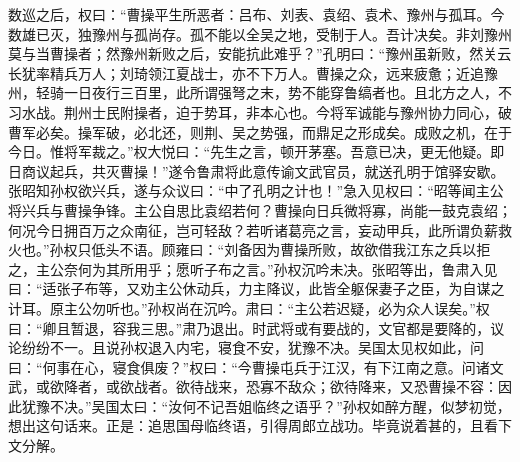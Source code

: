 数巡之后，权曰：“曹操平生所恶者：吕布、刘表、袁绍、袁术、豫州与孤耳。今数雄已灭，独豫州与孤尚存。孤不能以全吴之地，受制于人。吾计决矣。非刘豫州莫与当曹操者；然豫州新败之后，安能抗此难乎？”孔明曰：“豫州虽新败，然关云长犹率精兵万人；刘琦领江夏战士，亦不下万人。曹操之众，远来疲惫；近追豫州，轻骑一日夜行三百里，此所谓强弩之末，势不能穿鲁缟者也。且北方之人，不习水战。荆州士民附操者，迫于势耳，非本心也。今将军诚能与豫州协力同心，破曹军必矣。操军破，必北还，则荆、吴之势强，而鼎足之形成矣。成败之机，在于今日。惟将军裁之。”权大悦曰：“先生之言，顿开茅塞。吾意已决，更无他疑。即日商议起兵，共灭曹操！”遂令鲁肃将此意传谕文武官员，就送孔明于馆驿安歇。张昭知孙权欲兴兵，遂与众议曰：“中了孔明之计也！”急入见权曰：“昭等闻主公将兴兵与曹操争锋。主公自思比袁绍若何？曹操向日兵微将寡，尚能一鼓克袁绍；何况今日拥百万之众南征，岂可轻敌？若听诸葛亮之言，妄动甲兵，此所谓负薪救火也。”孙权只低头不语。顾雍曰：“刘备因为曹操所败，故欲借我江东之兵以拒之，主公奈何为其所用乎；愿听子布之言。”孙权沉吟未决。张昭等出，鲁肃入见曰：“适张子布等，又劝主公休动兵，力主降议，此皆全躯保妻子之臣，为自谋之计耳。原主公勿听也。”孙权尚在沉吟。肃曰：“主公若迟疑，必为众人误矣。”权曰：“卿且暂退，容我三思。”肃乃退出。时武将或有要战的，文官都是要降的，议论纷纷不一。且说孙权退入内宅，寝食不安，犹豫不决。吴国太见权如此，问曰：“何事在心，寝食俱废？”权曰：“今曹操屯兵于江汉，有下江南之意。问诸文武，或欲降者，或欲战者。欲待战来，恐寡不敌众；欲待降来，又恐曹操不容：因此犹豫不决。”吴国太曰：“汝何不记吾姐临终之语乎？”孙权如醉方醒，似梦初觉，想出这句话来。正是：追思国母临终语，引得周郎立战功。毕竟说着甚的，且看下文分解。